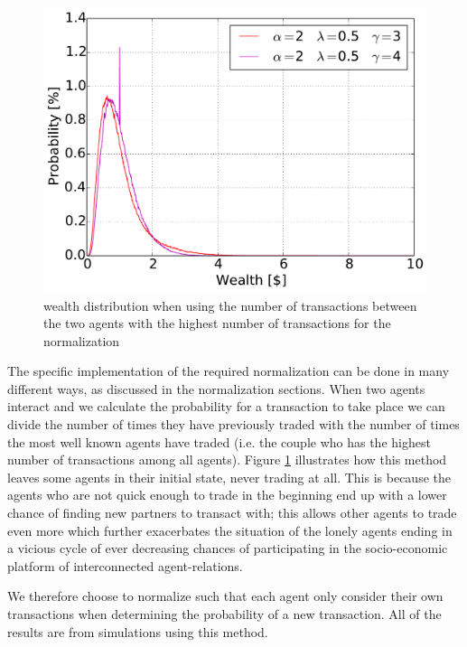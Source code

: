 \begin{figure}[H]
    \centering
    \includegraphics[width=\linewidth]{result/5e-2-50}
    \caption{wealth distribution when using the number of transactions between the two agents with the highest number of transactions for the normalization}
    \label{fig:spikeAgents}
\end{figure}

The specific implementation of the required normalization can be done in many different ways, as discussed in the normalization sections. When two agents interact and we calculate the probability for a transaction to take place we can divide the number of times they have previously traded with the number of times the most well known agents have traded (i.e. the couple who has the highest number of transactions among all agents). Figure \ref{fig:spikeAgents} illustrates how this method leaves some agents in their initial state, never trading at all. This is because the agents who are not quick enough to trade in the beginning end up with a lower chance of finding new partners to transact with; this allows other agents to trade even more which further exacerbates the situation of the lonely agents ending in a vicious cycle of ever decreasing chances of participating in the socio-economic platform of interconnected agent-relations.

We therefore choose to normalize such that each agent only consider their own transactions when determining the probability of a new transaction. All of the results are from simulations using this method. 

